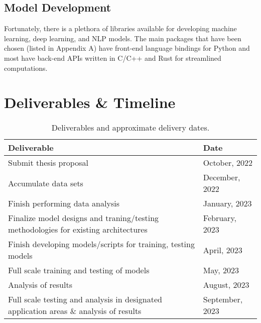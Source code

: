 \documentclass[10pt]{article}
\begin{document}
        \subsection{Model Development}
        Fortunately, there is a plethora of libraries available for developing machine learning, deep learning, and NLP models. The
        main packages that have been chosen (listed in Appendix A) have front-end language bindings for Python and most have
        back-end APIs written in C/C++ and Rust for streamlined computations.

    \section{Deliverables \& Timeline}
        \begin{table}[h!]
            \centering
            \begin{tabular}{l|l}
                \textbf{Deliverable} & \textbf{Date} \\
                \hline
                Submit thesis proposal & October, 2022 \\
                Accumulate data sets\footnotemark[4] & December, 2022 \\
                Finish performing data analysis\footnotemark[5] & January, 2023 \\
                Finalize model designs and traning/testing methodologies for existing architectures & February, 2023 \\
                Finish developing models/scripts for training, testing models & April, 2023 \\
                Full scale training and testing of models & May, 2023 \\
                Analysis of results\footnotemark[6] & August, 2023 \\
                Full scale testing and analysis in designated application areas \& analysis of results & September, 2023 \\
            \end{tabular}
            \label{table:timeline}
            \caption{Deliverables and approximate delivery dates.}
        \end{table}

    \newpage
    
    
\end{document}
